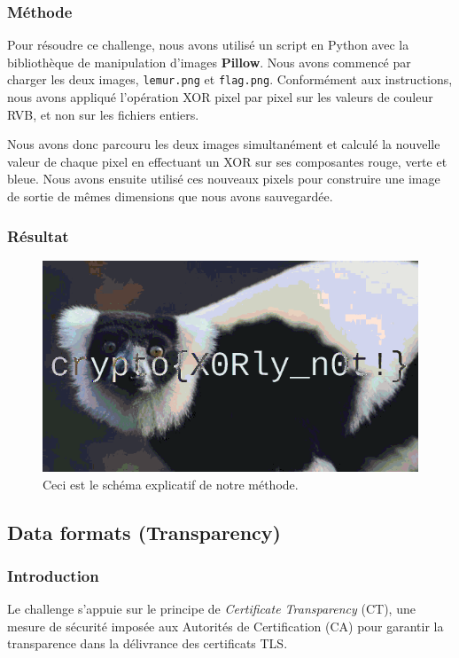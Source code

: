 \subsubsection{Méthode}
Pour résoudre ce challenge, nous avons utilisé un script en Python avec la
bibliothèque de manipulation d'images \textbf{Pillow}. Nous avons commencé
par charger les deux images, \texttt{lemur.png} et \texttt{flag.png}.
Conformément aux instructions, nous avons appliqué l'opération XOR pixel
par pixel sur les valeurs de couleur RVB, et non sur les fichiers entiers.

Nous avons donc parcouru les deux images simultanément et calculé la nouvelle
valeur de chaque pixel en effectuant un XOR sur ses composantes rouge,
verte et bleue. Nous avons ensuite utilisé ces nouveaux pixels pour
construire une image de sortie de mêmes dimensions que nous avons sauvegardée.

\subsubsection{Résultat}
\begin{figure}[H]
    \centering
    \includegraphics[width=0.8\linewidth]{Images/Lemur/xored_result.png}

    \caption{Ceci est le schéma explicatif de notre méthode.}

    \label{fig:encodeChallRes}
\end{figure}

\subsection{Data formats (Transparency)}
\subsubsection{Introduction}
Le challenge s'appuie sur le principe de \emph{Certificate Transparency}
(CT), une mesure de sécurité imposée aux Autorités de Certification (CA)
pour garantir la transparence dans la délivrance des certificats TLS.

